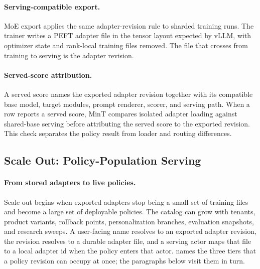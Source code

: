 \documentclass{llmxive}
\begin{document}
\paragraph{Serving-compatible export.}
MoE export applies the same adapter-revision rule to sharded training runs. The trainer writes a PEFT adapter file in the tensor layout expected by vLLM, with optimizer state and rank-local training files removed. The file that crosses from training to serving is the adapter revision.

\paragraph{Served-score attribution.}
A served score names the exported adapter revision together with its compatible base model, target modules, prompt renderer, scorer, and serving path. When a row reports a served score, MinT compares isolated adapter loading against shared-base serving before attributing the served score to the exported revision. This check separates the policy result from loader and routing differences.

\subsection{Scale Out: Policy-Population Serving}
\label{sec:scale_out_residency}

\paragraph{From stored adapters to live policies.}
Scale-out begins when exported adapters stop being a small set of training files and become a large set of deployable policies. The catalog can grow with tenants, product variants, rollback points, personalization branches, evaluation snapshots, and research sweeps. A user-facing name resolves to an exported adapter revision, the revision resolves to a durable adapter file, and a serving actor maps that file to a local adapter id when the policy enters that actor.  names the three tiers that a policy revision can occupy at once; the paragraphs below visit them in turn.
\end{document}
